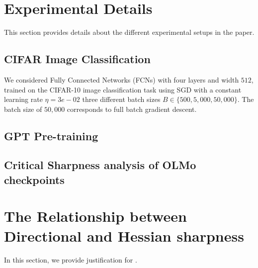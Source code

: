 \documentclass[]{fairmeta}
\theoremstyle{plain}
\theoremstyle{definition}
\begin{document}
\section{Experimental Details}
\label{appendix:experimental_details}

This section provides details about the different experimental setups in the paper.

\subsection{CIFAR Image Classification}
\label{appendix:details-cifar-iamge-classification}

We considered Fully Connected Networks (FCNs) with four layers and width $512$, trained on the CIFAR-10 image classification task using SGD with a constant learning rate $\eta = 3e-02$ three different batch sizes $B \in \{500, 5,000, 50,000\}$. The batch size of $50,000$ corresponds to full batch gradient descent.

\subsection{GPT Pre-training}
\label{appendix:details-gpt-pretraining}

\subsection{Critical Sharpness analysis of OLMo checkpoints}
\label{appendix:details-olmo-checkpoints}

\section{The Relationship between Directional and Hessian sharpness}
\label{appendix:directional_hessian_sharpness}

In this section, we provide justification for .
\end{document}
